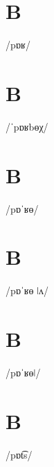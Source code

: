 \documentclass[10pt,a4paper,twoside]{book}
\begin{document}
\section*{B}

\begin{multicols}{3}
 {/pɒʁ/} {}
\end{multicols}

\section*{B}

\begin{multicols}{3}
 {/ˈpɒʁbɵχ/} {}
\end{multicols}

\section*{B}

\begin{multicols}{3}
 {/pɒˈʁɵ/} {}
\end{multicols}

\section*{B}

\begin{multicols}{3}
 {/pɒˈʁɵ ǀʌ/} {}
\end{multicols}

\section*{B}

\begin{multicols}{3}
 {/pɒˈʁɵǀ/} {}
\end{multicols}

\section*{B}

\begin{multicols}{3}
 {/pɒt͡s/} {}
\end{multicols}
\end{document}
